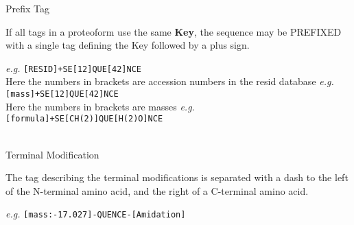 
\begin{newrule}
Prefix Tag
\end{newrule}

If all tags in a proteoform use the same \textbf{Key}, the sequence may be PREFIXED with a single tag defining the Key followed by a plus sign.

\indent \textit{e.g.} \texttt{[RESID]+SE[12]QUE[42]NCE} \\
\indent \indent Here the numbers in brackets are accession numbers in the resid database
\indent \textit{e.g.} \texttt{[mass]+SE[12]QUE[42]NCE} \\
\indent \indent Here the numbers in brackets are masses
\indent \textit{e.g.} \texttt{[formula]+SE[CH(2)]QUE[H(2)O]NCE} \\
\\

\begin{newrule}
Terminal Modification
\end{newrule}

The tag describing the terminal modifications is separated with a dash to the left of the N-terminal amino acid, and the right of a C-terminal amino acid.

\indent \textit{e.g.} \texttt{[mass:-17.027]-QUENCE-[Amidation]}
\\

